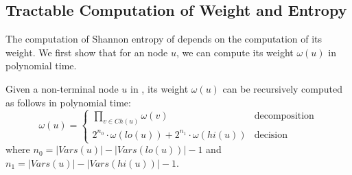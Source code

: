\subsection{Tractable Computation of Weight and Entropy}
	
	The computation of Shannon entropy of \ADDAND depends on the computation of its weight. 
    We first show that for an \ADDAND node $u$, we can compute its weight $\omega(u)$ in polynomial time.
	\begin{proposition}\label{prop:omega-proposition}
		Given a non-terminal node $u$ in \ADDAND, its weight $\mathit{\omega}(u)$ can be recursively computed as follows in polynomial time:
		\begin{equation*}
			\mathit{\omega}(u) =  
			\begin{cases}  
				\prod_{v \in Ch(u)}{\mathit{\omega}(v)}  & \text{decomposition}   \\
				2^{n_0} \cdot \mathit{\omega}(lo(u)) + 2^{n_1} \cdot \mathit{\omega}(hi(u))  & \text{decision}
				
			\end{cases}
	\end{equation*}
		where $n_0 = |\mathit{Vars}(u)| - |\mathit{Vars}(lo(u))| - 1 $ and $n_1 = |\mathit{Vars}(u)| - |\mathit{Vars}(hi(u))| - 1$. %
		

\end{proposition}
